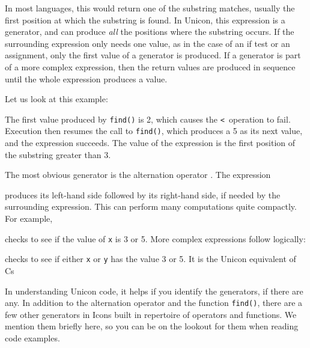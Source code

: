 
In most languages, this would return one of the substring matches,
usually the first position at which the substring is found. In Unicon,
this expression is a generator, and can produce \textit{all} the
positions where the substring occurs. If the surrounding expression
only needs one value, as in the case of an if test or an assignment,
only the first value of a generator is produced. If a generator is part
of a more complex expression, then the return values are produced in
sequence until the whole expression produces a value.

Let us look at this example:


The first value produced by \texttt{find()} is 2, which
causes the \texttt{{\textless}}\texttt{ }operation to fail. Execution
then resumes the call to \texttt{find()}, which produces a 5 as its
next value, and the expression succeeds. The value of the expression is
the first position of the substring greater than 3.

The most obvious generator is the alternation operator \texttt{{\textbar}}. The expression


\noindent
produces its left-hand side followed by its right-hand side, if needed
by the surrounding expression. This can perform many computations quite
compactly. For example,


\noindent
checks to see if the value of \texttt{x} is 3 or 5. More complex
expressions follow logically:


\noindent
checks to see if either \texttt{x} or \texttt{y} has the value 3 or
5. It is the Unicon equivalent of C{\textquotesingle}s


In understanding Unicon code, it helps if you identify the
generators, if there are any. In addition to the alternation operator
\texttt{{\textbar}} and the function \texttt{find()}, there are a few
other generators in Icon{\textquotesingle}s built in repertoire of
operators and functions. We mention them briefly here, so you can be on
the lookout for them when reading code examples.

